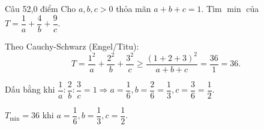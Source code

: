 \begin{de_cau}{Câu 5}{2,0 điểm}
Cho $a,b,c>0$ thỏa mãn $a+b+c=1$. Tìm $\min$ của $T=\dfrac{1}{a}+\dfrac{4}{b}+\dfrac{9}{c}$.
\end{de_cau}

\begin{loi_giai_cau}
Theo Cauchy-Schwarz (Engel/Titu):
\[T = \frac{1^2}{a}+\frac{2^2}{b}+\frac{3^2}{c}\geq\frac{(1+2+3)^2}{a+b+c}=\frac{36}{1}=36.\]

Dấu bằng khi $\dfrac{1}{a}:\dfrac{2}{b}:\dfrac{3}{c}=1\Rightarrow a=\dfrac{1}{6}, b=\dfrac{2}{6}=\dfrac{1}{3}, c=\dfrac{3}{6}=\dfrac{1}{2}$.

$T_{\min}=\boxed{36}$ khi $a=\dfrac{1}{6},b=\dfrac{1}{3},c=\dfrac{1}{2}$.
\end{loi_giai_cau}
